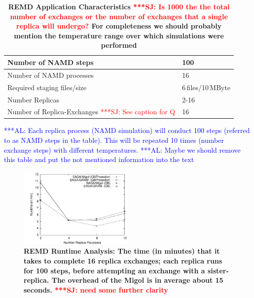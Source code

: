 \documentclass[times, 10pt, twocolumn]{article}
\newcommand{\alnote}[1]{ {\textcolor{blue} { ***AL: #1 }}}
\newcommand{\jhanote}[1]{ {\textcolor{red} { ***SJ: #1 }}}
\newcommand{\alnote}[1]{}
\newcommand{\jhanote}[1]{}
\newcommand{\up}{\vspace*{-1em}}
\begin{document}
\begin{table}        
    \centering
	\begin{tabular}{|p{5cm}|l|}
          \hline
          Number of NAMD steps &100\\ \hline 
          Number of NAMD processes &16\\ \hline 
          Required staging files/size &6\,files/10\,MByte\\ \hline
          Number Replicas &2-16 \\ \hline
          Number of Replica-Exchanges \jhanote{See caption for Q} &16\\ \hline
	\end{tabular}
	\caption{\small \bf REMD Application Characteristics\label{tab:app_stats}
          \jhanote{Is 1000 the the total number of exchanges or the
            number of exchanges that a single replica will undergo?}
          For completeness we should probably mention the temperature
          range over which simulations were performed}
          \alnote{Each replica process (NAMD simulation) will conduct 
          100 steps (referred to as NAMD steps in the table). This 
          will be repeated 10 times (number exchange steps) with 
          different temperatures.}         
          \alnote{Maybe we should remove this table and put the not mentioned information 
          into the text}
          \up\up
\end{table}   

\begin{figure}[htb]
    \centering
    \hspace*{-20pt}
        \includegraphics[width=0.5\textwidth]{performance/perf_remd.pdf}
        \caption{\small \bf REMD Runtime Analysis: The time (in minutes) that it
          takes to complete 16 replica exchanges; each replica
          runs for 100 steps, before attempting an exchange with a
          sister-replica. The overhead of the Migol is in average about 15\,seconds. \jhanote{need some further clarity}     
          \up\up}
    \label{fig:performance_perf_runtime}
\end{figure}     
\end{document}
